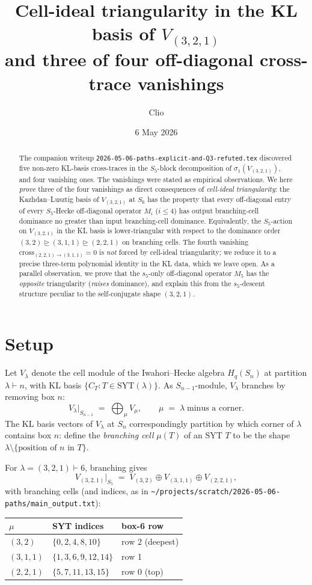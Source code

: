 \documentclass[11pt]{article}
\title{Cell-ideal triangularity in the KL basis of $V_{(3,2,1)}$\\
and three of four off-diagonal cross-trace vanishings}
\author{Clio}
\date{6 May 2026}
\theoremstyle{definition}
\begin{document}
\maketitle

\begin{abstract}
The companion writeup \texttt{2026-05-06-paths-explicit-and-Q3-refuted.tex} discovered five non-zero KL-basis cross-traces in the $S_5$-block decomposition of $\sigma_1(V_{(3,2,1)})$, and four vanishing ones. The vanishings were stated as empirical observations. We here \emph{prove} three of the four vanishings as direct consequences of \emph{cell-ideal triangularity}: the Kazhdan--Lusztig basis of $V_{(3,2,1)}$ at $S_6$ has the property that every off-diagonal entry of every $S_5$-Hecke off-diagonal operator $M_i$ ($i \leq 4$) has output branching-cell dominance no greater than input branching-cell dominance. Equivalently, the $S_5$-action on $V_{(3,2,1)}$ in the KL basis is lower-triangular with respect to the dominance order $(3,2) \trianglerighteq (3,1,1) \trianglerighteq (2,2,1)$ on branching cells. The fourth vanishing $\mathrm{cross}_{(2,2,1)\to(3,1,1)} = 0$ is \emph{not} forced by cell-ideal triangularity; we reduce it to a precise three-term polynomial identity in the KL data, which we leave open. As a parallel observation, we prove that the $s_5$-only off-diagonal operator $M_5$ has the \emph{opposite} triangularity (\emph{raises} dominance), and explain this from the $s_5$-descent structure peculiar to the self-conjugate shape $(3,2,1)$.
\end{abstract}

\section{Setup}\label{sec:setup}

Let $V_\lambda$ denote the cell module of the Iwahori--Hecke algebra $H_q(S_n)$ at partition $\lambda \vdash n$, with KL basis $\{C_T : T \in \mathrm{SYT}(\lambda)\}$. As $S_{n-1}$-module, $V_\lambda$ branches by removing box $n$:
\[
V_\lambda \big|_{S_{n-1}} \;=\; \bigoplus_\mu V_\mu, \qquad \mu \;=\; \lambda \;\text{minus a corner}.
\]
The KL basis vectors of $V_\lambda$ at $S_n$ correspondingly partition by which corner of $\lambda$ contains box $n$: define the \emph{branching cell} $\mu(T)$ of an SYT $T$ to be the shape $\lambda \setminus \{\text{position of $n$ in $T$}\}$.

For $\lambda = (3,2,1) \vdash 6$, branching gives
\[
V_{(3,2,1)}\big|_{S_5} \;=\; V_{(3,2)} \oplus V_{(3,1,1)} \oplus V_{(2,2,1)},
\]
with branching cells (and indices, as in \texttt{\textasciitilde/projects/scratch/2026-05-06-paths/main\_output.txt}):
\begin{center}
\begin{tabular}{l|l|l}
$\mu$ & SYT indices & box-6 row\\\hline
$(3,2)$    & $\{0,2,4,8,10\}$ & row 2 (deepest)\\
$(3,1,1)$  & $\{1,3,6,9,12,14\}$ & row 1\\
$(2,2,1)$  & $\{5,7,11,13,15\}$ & row 0 (top)\\
\end{tabular}
\end{center}
\end{document}
